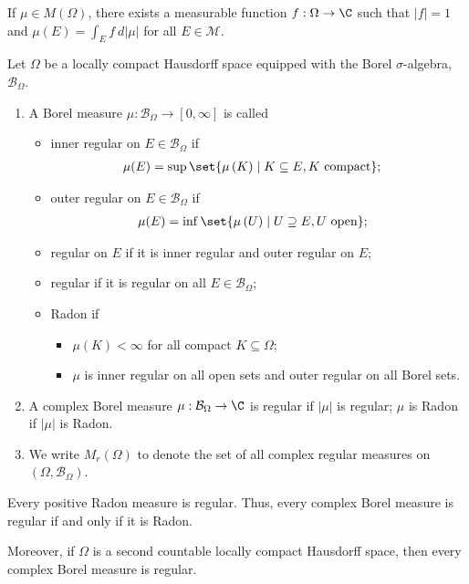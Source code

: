 \begin{fact}
  If $\mu\in M\left(\Omega\right)$, there exists a measurable function $f: \Omega\rightarrow \C$ such that $\left\vert f \right\vert = 1$ and $\mu\left(E\right) = \int_{E}^{} f\:d\left\vert \mu \right\vert$ for all $E\in \mathcal{M}$.
\end{fact}
\begin{definition}
  Let $\Omega$ be a locally compact Hausdorff space equipped with the Borel $\sigma$-algebra, $\mathcal{B}_{\Omega}$.
  \begin{enumerate}[(1)]
    \item A Borel measure $\mu: \mathcal{B}_{\Omega}\rightarrow [0,\infty]$ is called
      \begin{itemize}
        \item inner regular on $E\in \mathcal{B}_{\Omega}$ if
          \begin{align*}
            \mu(E) &= \sup\set{\mu\left(K\right)\mid K\subseteq E, K\text{ compact}};
          \end{align*}
        \item outer regular on $E\in \mathcal{B}_{\Omega}$ if
          \begin{align*}
            \mu(E) &= \inf\set{\mu\left(U\right)\mid U\supseteq E,U\text{ open}};
          \end{align*}
        \item regular on $E$ if it is inner regular and outer regular on $E$;
        \item regular if it is regular on all $E\in \mathcal{B}_{\Omega}$;
        \item Radon if
          \begin{itemize}
            \item $\mu(K) < \infty$ for all compact $K\subseteq \Omega$;
            \item $\mu$ is inner regular on all open sets and outer regular on all Borel sets.
          \end{itemize}
      \end{itemize}
    \item A complex Borel measure $\mu: \mathcal{B}_{\Omega}\rightarrow \C$ is regular if $\left\vert \mu \right\vert$ is regular; $\mu$ is Radon if $\left\vert \mu \right\vert$ is Radon.
    \item We write $M_{r}\left(\Omega\right)$ to denote the set of all complex regular measures on $\left(\Omega,\mathcal{B}_{\Omega}\right)$.
  \end{enumerate}
\end{definition}
\begin{fact}
  Every positive Radon measure is regular. Thus, every complex Borel measure is regular if and only if it is Radon.\newline

  Moreover, if $\Omega$ is a second countable locally compact Hausdorff space, then every complex Borel measure is regular.
\end{fact}

